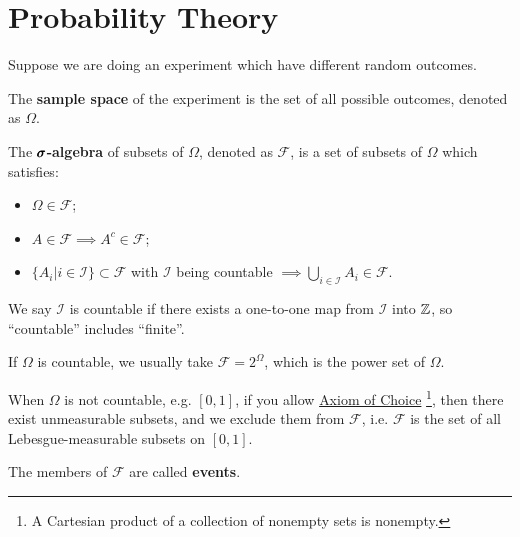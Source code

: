 \section{Probability Theory}

Suppose we are doing an experiment which have different random outcomes.

\begin{definition}
    The \textbf{sample space} of the experiment is the set of all possible outcomes, denoted as $\Omega$.
\end{definition}

\begin{definition}
    The $\pmb{\sigma}$\textbf{-algebra} of subsets of $\Omega$, denoted as $\mathcal{F}$, is a set of subsets of $\Omega$ which satisfies:
    \begin{itemize}
        \item $\Omega \in \mathcal{F}$;
        \item $A \in \mathcal{F} \implies A^c \in \mathcal{F}$;
        \item $\{ A_i | i \in \mathcal{I} \} \subset \mathcal{F}$ with $\mathcal{I}$ being countable $\implies \bigcup\limits_{i \in \mathcal{I}} A_i \in \mathcal{F}$.
    \end{itemize}
\end{definition}

\begin{remark}
    We say $\mathcal{I}$ is countable if there exists a one-to-one map from $\mathcal{I}$ into $\mathbb{Z}$, so ``countable'' includes ``finite''.
\end{remark}

\begin{example}
    If $\Omega$ is countable, we usually take \textcolor{myblue}{$\mathcal{F} = 2^\Omega$}, which is the \textcolor{myblue}{power set of $\Omega$}.
\end{example}

\begin{example}
    When $\Omega$ is not countable, e.g. $[0,1]$, if you allow \href{https://en.wikipedia.org/wiki/Axiom_of_choice}{Axiom of Choice} \footnote{A Cartesian product of a collection of nonempty sets is nonempty.}, then there exist unmeasurable subsets, and we exclude them from $\mathcal{F}$, i.e. $\mathcal{F}$ is the set of all Lebesgue-measurable subsets on $[0,1]$.
\end{example}

\begin{definition}[Events]
    The members of $\mathcal{F}$ are called \textbf{events}.
\end{definition}

